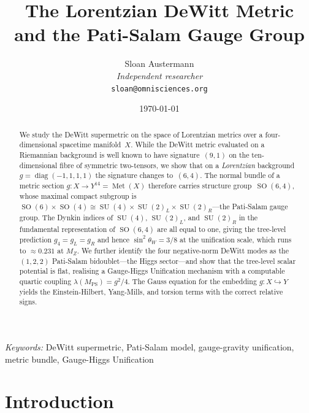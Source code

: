 \documentclass[12pt,a4paper]{article}
\title{\textbf{The Lorentzian DeWitt Metric\\ and the Pati-Salam Gauge Group}}
\author{Sloan Austermann\\[4pt]
\small\textit{Independent researcher}\\
\small\texttt{sloan@omnisciences.org}}
\date{\today}
\theoremstyle{definition}
\newcommand{\Met}{\operatorname{Met}}
\newcommand{\SO}{\operatorname{SO}}
\newcommand{\SU}{\operatorname{SU}}
\newcommand{\diag}{\operatorname{diag}}
\begin{document}
\maketitle

\begin{abstract}
We study the DeWitt supermetric on the space of Lorentzian metrics over a four-dimensional spacetime manifold~$X$.
While the DeWitt metric evaluated on a Riemannian background is well known to have signature~$(9,1)$ on the ten-dimensional fibre of symmetric two-tensors, we show that on a \emph{Lorentzian} background $g = \diag(-1,1,1,1)$ the signature changes to~$(6,4)$.
The normal bundle of a metric section $g\colon X \to Y^{14} = \Met(X)$ therefore carries structure group~$\SO(6,4)$, whose maximal compact subgroup is $\SO(6)\times\SO(4) \cong \SU(4)\times\SU(2)_L\times\SU(2)_R$---the Pati-Salam gauge group.
The Dynkin indices of $\SU(4)$, $\SU(2)_L$, and $\SU(2)_R$ in the fundamental representation of $\SO(6,4)$ are all equal to one, giving the tree-level prediction $g_4 = g_L = g_R$ and hence $\sin^2\theta_W = 3/8$ at the unification scale, which runs to $\approx 0.231$ at $M_Z$.
We further identify the four negative-norm DeWitt modes as the $(1,2,2)$ Pati-Salam bidoublet---the Higgs sector---and show that the tree-level scalar potential is flat, realising a Gauge-Higgs Unification mechanism with a computable quartic coupling $\lambda(M_{\mathrm{PS}}) = g^2/4$.
The Gauss equation for the embedding $g\colon X \hookrightarrow Y$ yields the Einstein-Hilbert, Yang-Mills, and torsion terms with the correct relative signs.
\end{abstract}

\vspace{10pt}
\noindent\textit{Keywords:} DeWitt supermetric, Pati-Salam model, gauge-gravity unification, metric bundle, Gauge-Higgs Unification

\newpage
\tableofcontents
\newpage

\section{Introduction}
\label{sec:intro}
\end{document}
